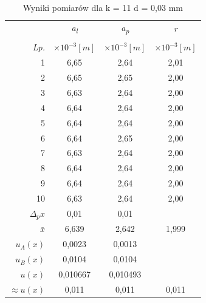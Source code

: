 \documentclass[polish, 11pt, a4paper]{article}
\begin{document}
		\begin{table}[h]
		\centering
		\captionsetup{singlelinecheck=false, margin = 4.5cm, justification=centering}
		\caption{Wyniki pomiarów dla k = 11 \newline d = 0,03 mm}
		\begin{tabular}{|r|c|c|c|} \hline
			&	\textit{a\textsubscript{l}}	&	\textit{a\textsubscript{p}}	&	\textit{r}	\\
			&&& \\[-1em]
			\textit{Lp.}& \(\times{10^{-3} [m]}\)& \(\times{10^{-3} [m]}\)& \(\times{10^{-3} [m]}\) \\\hline
			1	&	6,65	&	2,64	&	2,01	\\\hline
			2	&	6,65	&	2,65	&	2,00	\\\hline
			3	&	6,63	&	2,64	&	2,00	\\\hline
			4	&	6,64	&	2,64	&	2,00	\\\hline
			5	&	6,64	&	2,64	&	2,00	\\\hline
			6	&	6,64	&	2,65	&	2,00	\\\hline
			7	&	6,63	&	2,64	&	2,00	\\\hline
			8	&	6,64	&	2,64	&	2,00	\\\hline
			9	&	6,64	&	2,64	&	2,00	\\\hline
			10	&	6,63	&	2,64	&	2,00	\\\hline
			\(\Delta{_px}\)	&	0,01	&	0,01	&		\\\hline
			\(\bar{x}\)	&	6,639	&	2,642	&	1,999	\\\hline
			\(u_A(x)\)	&	0,0023	&	0,0013	&		\\\hline
			\(u_B(x)\)	&	0,0104	&	0,0104	&		\\\hline
			\(u(x)\)	&	0,010667	&	0,010493	&		\\\hline
			\(\approx{u(x)}\)	&	0,011	&	0,011	&	0,011	\\\hline
		\end{tabular}
		\vspace{0.75cm}
		

\end{table}
\end{document}
